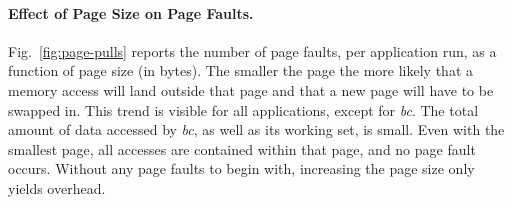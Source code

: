 \paragraph{Effect of Page Size on Page Faults.}

Fig.~\ref{fig:page-pulls} reports the number of page faults, per application
run, as a function of page size (in bytes).
%
The smaller the page the more likely that a memory access will land
outside that page and that a new page will have to be swapped in.
%
This trend is visible for all applications, except for \textit{bc}. The total
amount of data accessed by \textit{bc}, as well as its working set, is small.
Even with the smallest page, all accesses are contained within that page, and
no page fault occurs. Without any page faults to begin with, increasing the
page size only yields overhead.

